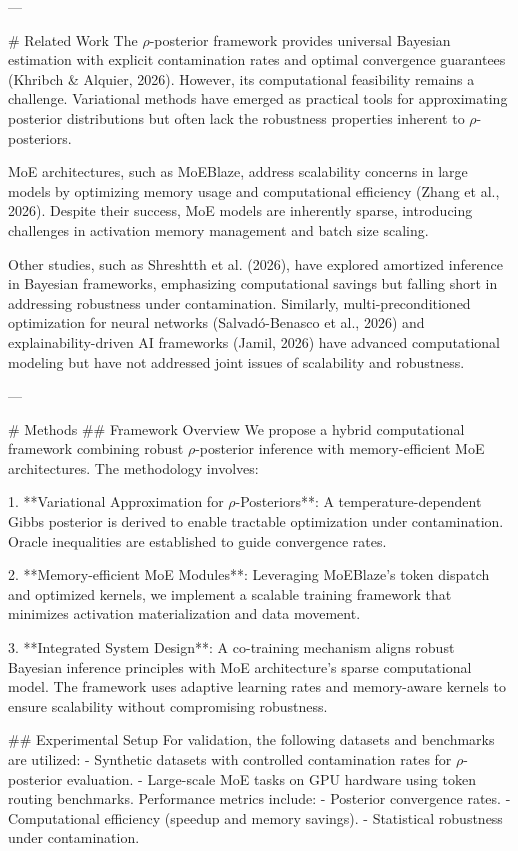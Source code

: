 ---

# Related Work  
The $ρ$-posterior framework provides universal Bayesian estimation with explicit contamination rates and optimal convergence guarantees (Khribch & Alquier, 2026). However, its computational feasibility remains a challenge. Variational methods have emerged as practical tools for approximating posterior distributions but often lack the robustness properties inherent to $ρ$-posteriors.

MoE architectures, such as MoEBlaze, address scalability concerns in large models by optimizing memory usage and computational efficiency (Zhang et al., 2026). Despite their success, MoE models are inherently sparse, introducing challenges in activation memory management and batch size scaling.

Other studies, such as Shreshtth et al. (2026), have explored amortized inference in Bayesian frameworks, emphasizing computational savings but falling short in addressing robustness under contamination. Similarly, multi-preconditioned optimization for neural networks (Salvadó-Benasco et al., 2026) and explainability-driven AI frameworks (Jamil, 2026) have advanced computational modeling but have not addressed joint issues of scalability and robustness.

---

# Methods  
## Framework Overview  
We propose a hybrid computational framework combining robust $ρ$-posterior inference with memory-efficient MoE architectures. The methodology involves:

1. **Variational Approximation for $ρ$-Posteriors**:  
   A temperature-dependent Gibbs posterior is derived to enable tractable optimization under contamination. Oracle inequalities are established to guide convergence rates.

2. **Memory-efficient MoE Modules**:  
   Leveraging MoEBlaze's token dispatch and optimized kernels, we implement a scalable training framework that minimizes activation materialization and data movement.

3. **Integrated System Design**:  
   A co-training mechanism aligns robust Bayesian inference principles with MoE architecture's sparse computational model. The framework uses adaptive learning rates and memory-aware kernels to ensure scalability without compromising robustness.

## Experimental Setup  
For validation, the following datasets and benchmarks are utilized:
- Synthetic datasets with controlled contamination rates for $ρ$-posterior evaluation.
- Large-scale MoE tasks on GPU hardware using token routing benchmarks.  
Performance metrics include:
- Posterior convergence rates.
- Computational efficiency (speedup and memory savings).
- Statistical robustness under contamination.

